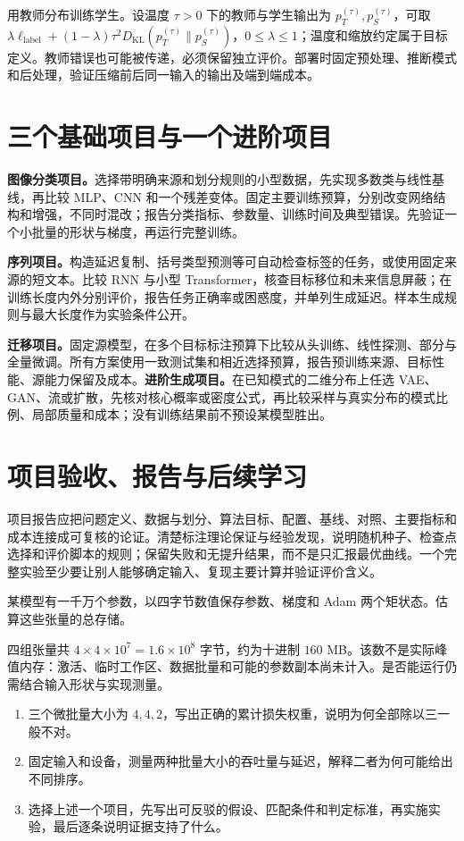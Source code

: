 \documentclass[UTF8,12pt,a4paper,fontset=fandol]{ctexbook}
\begin{document}
用教师分布训练学生。设温度 $\tau>0$ 下的教师与学生输出为 $p_T^{(\tau)},p_S^{(\tau)}$，可取 $\lambda\ell_{\mathrm{label}}+(1-\lambda)\tau^2D_{\mathrm{KL}}(p_T^{(\tau)}\|p_S^{(\tau)})$，$0\leq\lambda\leq1$；温度和缩放约定属于目标定义。教师错误也可能被传递，必须保留独立评价。部署时固定预处理、推断模式和后处理，验证压缩前后同一输入的输出及端到端成本。

\section{三个基础项目与一个进阶项目}
\textbf{图像分类项目。}选择带明确来源和划分规则的小型数据，先实现多数类与线性基线，再比较 MLP、CNN 和一个残差变体。固定主要训练预算，分别改变网络结构和增强，不同时混改；报告分类指标、参数量、训练时间及典型错误。先验证一个小批量的形状与梯度，再运行完整训练。

\textbf{序列项目。}构造延迟复制、括号类型预测等可自动检查标签的任务，或使用固定来源的短文本。比较 RNN 与小型 Transformer，核查目标移位和未来信息屏蔽；在训练长度内外分别评价，报告任务正确率或困惑度，并单列生成延迟。样本生成规则与最大长度作为实验条件公开。

\textbf{迁移项目。}固定源模型，在多个目标标注预算下比较从头训练、线性探测、部分与全量微调。所有方案使用一致测试集和相近选择预算，报告预训练来源、目标性能、源能力保留及成本。\textbf{进阶生成项目。}在已知模式的二维分布上任选 VAE、GAN、流或扩散，先核对核心概率或密度公式，再比较采样与真实分布的模式比例、局部质量和成本；没有训练结果前不预设某模型胜出。

\section{项目验收、报告与后续学习}
项目报告应把问题定义、数据与划分、算法目标、配置、基线、对照、主要指标和成本连接成可复核的论证。清楚标注理论保证与经验发现，说明随机种子、检查点选择和评价脚本的规则；保留失败和无提升结果，而不是只汇报最优曲线。一个完整实验至少要让别人能够确定输入、复现主要计算并验证评价含义。

\begin{example}[训练状态的存储估计]
某模型有一千万个参数，以四字节数值保存参数、梯度和 Adam 两个矩状态。估算这些张量的总存储。
\end{example}
\begin{solve}
四组张量共 $4\times4\times10^7=1.6\times10^8$ 字节，约为十进制 $160$ MB。该数不是实际峰值内存：激活、临时工作区、数据批量和可能的参数副本尚未计入。是否能运行仍需结合输入形状与实现测量。
\end{solve}
\begin{enumerate}
\item 三个微批量大小为 $4,4,2$，写出正确的累计损失权重，说明为何全部除以三一般不对。
\item 固定输入和设备，测量两种批量大小的吞吐量与延迟，解释二者为何可能给出不同排序。
\item 选择上述一个项目，先写出可反驳的假设、匹配条件和判定标准，再实施实验，最后逐条说明证据支持了什么。
\end{enumerate}
\end{document}
